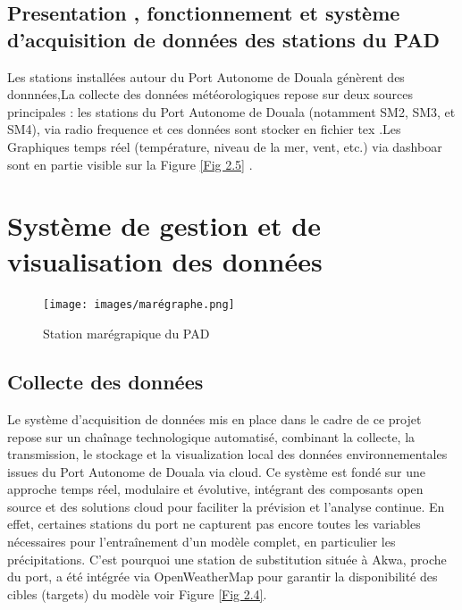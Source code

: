 \documentclass[a4paper,12pt,openany]{report}
\begin{document}
	\subsection{Presentation , fonctionnement et système d’acquisition de données  des  stations du PAD}

\quad Les stations installées autour du Port Autonome de Douala génèrent des donnnées,La collecte des données météorologiques repose sur deux sources principales : les stations du Port Autonome de Douala (notamment SM2, SM3, et SM4), via radio frequence et ces données sont stocker en fichier tex .Les Graphiques temps réel (température, niveau de la mer, vent, etc.) via dashboar sont en partie visible sur la  Figure \ref{Fig 2.5} .
\section{Système de gestion et de visualisation des données}
		\begin{figure}[H]
			\begin{center}
                \begin{minipage}{\textwidth}
	    	     \begin{center}
	    	      \texttt{[image: images/marégraphe.png]}
	    	      \end{center}
	    	     \end{minipage}
				
				
				\caption{Station marégrapique du PAD \label{Fig 2.3}}
			\end{center}
		\end{figure}%
	
		
		\subsection{Collecte des données}
		
		\quad Le système d’acquisition de données mis en place dans le cadre de ce projet repose sur un chaînage technologique automatisé, combinant la collecte, la transmission, le stockage et la visualization local  des données environnementales issues du Port Autonome de Douala via cloud. Ce système est fondé sur une approche temps réel, modulaire et évolutive, intégrant des composants open source et des solutions cloud pour faciliter la prévision et l’analyse continue. En effet, certaines stations du port ne capturent pas encore toutes les variables nécessaires pour l'entraînement d’un modèle complet, en particulier les précipitations. C’est pourquoi une station de substitution située à Akwa, proche du port, a été intégrée via OpenWeatherMap pour garantir la disponibilité des cibles (targets) du modèle voir Figure \ref{Fig 2.4}.
		
\end{document}
